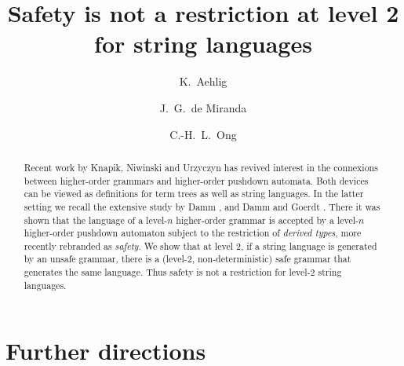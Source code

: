 \documentclass[RR]{OUCLdocument}
\title{Safety is not a restriction at level 2\\ for string languages}
\date{}
\author{K.~Aehlig \and J.~G.~de Miranda \and C.-H.~L.~Ong}
\theoremstyle{definition}
\theoremstyle{remark}
\begin{document}
\maketitle


\begin{abstract}
Recent work by Knapik, Niwinski and Urzyczyn \cite{KNU02} has revived
interest in the connexions between higher-order grammars and
higher-order pushdown automata. Both devices can be viewed as
definitions for term trees as well as string languages. In the latter
setting we recall the extensive study by Damm \cite{Dam82}, and Damm
and Goerdt \cite{DG86}. There it was shown that the language of a
level-$n$ higher-order grammar is accepted by a level-$n$ higher-order
pushdown automaton subject to the restriction of \emph{derived types},
more recently rebranded as \emph{safety}. We show that at level 2, if
a string language is generated by an unsafe grammar, there is a
(level-2, non-deterministic) safe grammar that generates the same
language.  Thus safety is not a restriction for level-2 string
languages.

\end{abstract}

\tableofcontents















\section{Further directions}




\end{document}
